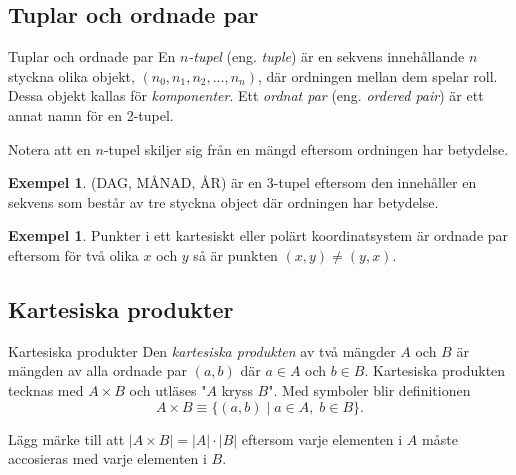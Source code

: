 \documentclass{article}
\theoremstyle{definition}
\newtheorem{exmp}[thm]{Exempel}
\begin{document}
\subsection{Tuplar och ordnade par}
\begin{mydef}{Tuplar och ordnade par}{}
  En $n$\textit{-tupel} (eng. \textit{tuple}) är en sekvens innehållande $n$ styckna olika objekt, $(n_0, n_1, n_2, \ldots, n_n)$, där ordningen mellan dem spelar roll. Dessa objekt
  kallas för \textit{komponenter}. Ett \textit{ordnat par} (eng. \textit{ordered pair}) är ett annat namn för en 2-tupel.
\end{mydef}
Notera att en $n$-tupel skiljer sig från en mängd eftersom ordningen har betydelse.
\begin{exmp}
  (DAG, MÅNAD, ÅR) är en 3-tupel 
  eftersom den innehåller 
  en sekvens som består av tre styckna object där ordningen har betydelse. 
\end{exmp}

\begin{exmp}
  Punkter i ett kartesiskt eller polärt koordinatsystem är ordnade par
  eftersom för två olika $x$ och $y$ så är punkten $(x, y) \neq (y, x)$. 
\end{exmp}

\subsection{Kartesiska produkter}

\begin{mydef}{Kartesiska produkter}{}
  Den \textit{kartesiska produkten} av två mängder $A$ och $B$ är mängden av alla ordnade par $(a, b)$
  där $a \in A$ och $b \in B$. Kartesiska produkten tecknas med $A \times B$ och utläses "$A$ kryss $B$".
  Med symboler blir definitionen
  \[A \times B \equiv \{(a, b) \; | \; a \in A, \; b \in B\}.\]
\end{mydef}
Lägg märke till att $|A \times B|=|A| \cdot |B|$ eftersom varje elementen i $A$
måste accosieras med varje elementen i $B$.
\end{document}
